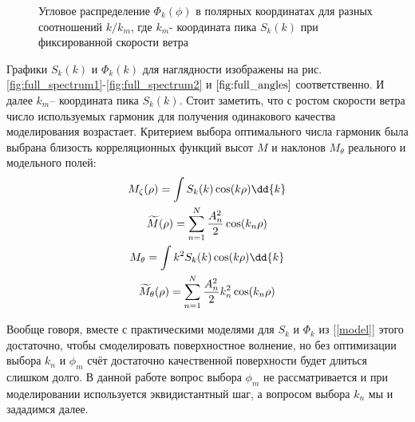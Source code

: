 \begin{figure}[h!]
\begin{minipage}{0.49\linewidth}
	\end{minipage}
	\caption{Угловое распределение $\Phi_k(\phi)$ в полярных координатах для разных соотношений $k/k_m$, где $k_m$- координата пика $S_k(k)$ при фиксированной скорости ветра}
	\label{fig:full_angles}
\end{figure}


Графики $S_k(k)$ и $\Phi_k(k)$ для наглядности изображены на рис.\ref{fig:full_spectrum1}-\ref{fig:full_spectrum2}  и $\ref{fig:full_angles}$ соответственно. И далее $k_m $-- координата пика $S_k(k)$. Стоит заметить, что
 с ростом скорости ветра число используемых гармоник для получения одинакового качества моделирования возрастает.
 Критерием выбора оптимального числа гармоник была выбрана близость корреляционных функций высот $M$ и наклонов $M_{\theta}$ реального и модельного полей:
\begin{gather*}
	M_{\zeta}(\rho)= \int S_k(k) \cos(k \rho)\dd{k} \\
	\tM(\rho)= \sum_{n=1}^N \frac{A^2_n}{2}\cos(k_n \rho)\\
	M_{\theta}= \int k^2 S_k(k)\cos(k \rho) \dd{k} \\
	\tM_{\theta}(\rho)=\sum_{n=1}^N \frac{A_n^2}{2} k_n^2 \cos(k_n \rho)
\end{gather*}





Вообще говоря, вместе с практическими моделями для $S_k$ и $\Phi_k$ из [\ref{model}] этого достаточно, чтобы смоделировать поверхностное волнение, но без оптимизации выбора $k_n$ и $\phi_m$ счёт достаточно качественной поверхности будет длиться  слишком долго. В данной работе вопрос выбора $\phi_m$ не рассматривается и при моделировании используется эквидистантный шаг, а вопросом выбора $k_n$ мы и зададимся далее. 


